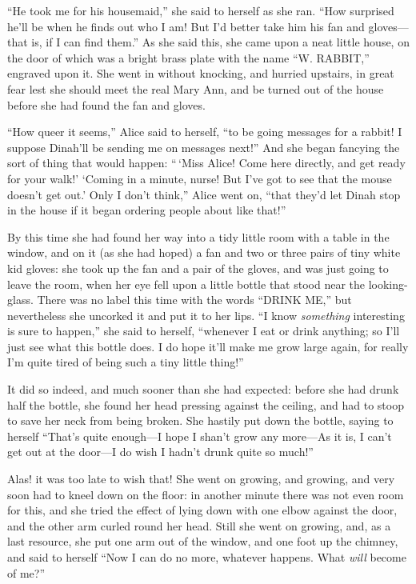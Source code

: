 \documentclass[book, 20pt]{extbook}
\begin{document}
``He took me for his housemaid,'' she said to herself as she ran. ``How
surprised he'll be when he finds out who I am! But I'd better take him
his fan and gloves---that is, if I can find them.'' As she said this,
she came upon a neat little house, on the door of which was a bright
brass plate with the name ``W. RABBIT,'' engraved upon it. She went in
without knocking, and hurried upstairs, in great fear lest she should
meet the real Mary Ann, and be turned out of the house before she had
found the fan and gloves.

``How queer it seems,'' Alice said to herself, ``to be going messages
for a rabbit! I suppose Dinah'll be sending me on messages next!'' And
she began fancying the sort of thing that would happen: ``\,`Miss Alice!
Come here directly, and get ready for your walk!' `Coming in a minute,
nurse! But I've got to see that the mouse doesn't get out.' Only I don't
think,'' Alice went on, ``that they'd let Dinah stop in the house if it
began ordering people about like that!''

By this time she had found her way into a tidy little room with a table
in the window, and on it (as she had hoped) a fan and two or three pairs
of tiny white kid gloves: she took up the fan and a pair of the gloves,
and was just going to leave the room, when her eye fell upon a little
bottle that stood near the looking-glass. There was no label this time
with the words ``DRINK ME,'' but nevertheless she uncorked it and put it
to her lips. ``I know \emph{something} interesting is sure to happen,''
she said to herself, ``whenever I eat or drink anything; so I'll just
see what this bottle does. I do hope it'll make me grow large again, for
really I'm quite tired of being such a tiny little thing!''

It did so indeed, and much sooner than she had expected: before she had
drunk half the bottle, she found her head pressing against the ceiling,
and had to stoop to save her neck from being broken. She hastily put
down the bottle, saying to herself ``That's quite enough---I hope I
shan't grow any more---As it is, I can't get out at the door---I do wish
I hadn't drunk quite so much!''

Alas! it was too late to wish that! She went on growing, and growing,
and very soon had to kneel down on the floor: in another minute there
was not even room for this, and she tried the effect of lying down with
one elbow against the door, and the other arm curled round her head.
Still she went on growing, and, as a last resource, she put one arm out
of the window, and one foot up the chimney, and said to herself ``Now I
can do no more, whatever happens. What \emph{will} become of me?''
\end{document}
